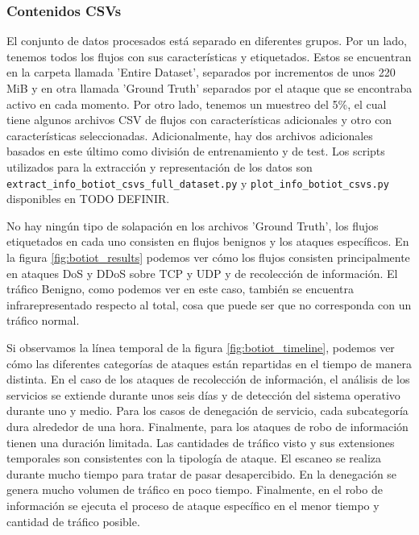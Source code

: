 \subsubsection{Contenidos CSVs}

El conjunto de datos procesados está separado en diferentes grupos. Por un lado, tenemos todos los flujos con sus características y etiquetados. Estos se encuentran en la carpeta llamada 'Entire Dataset', separados por incrementos de unos 220 MiB y en otra llamada 'Ground Truth' separados por  el ataque que se encontraba activo en cada momento. Por otro lado, tenemos un muestreo del 5\%, el cual tiene algunos archivos CSV de flujos con características adicionales y otro con características seleccionadas. Adicionalmente, hay dos archivos adicionales basados en este último como división de entrenamiento y de test. Los scripts utilizados para la extracción y representación de los datos son \texttt{extract\_info\_botiot\_csvs\_full\_dataset.py} y \texttt{plot\_info\_botiot\_csvs.py} disponibles en TODO DEFINIR.

No hay ningún tipo de solapación en los archivos 'Ground Truth', los flujos etiquetados en cada uno consisten en flujos benignos y los ataques específicos. En la figura \ref{fig:botiot_results} podemos ver cómo los flujos consisten principalmente en ataques DoS y DDoS sobre TCP y UDP y de recolección de información. El tráfico Benigno, como podemos ver en este caso, también se encuentra infrarepresentado respecto al total, cosa que puede ser que no corresponda con un tráfico normal. 

Si observamos la línea temporal de la figura \ref{fig:botiot_timeline}, podemos ver cómo las diferentes categorías de ataques están repartidas en el tiempo de manera distinta. En el caso de los ataques de recolección de información, el análisis de los servicios se extiende durante unos seis días y de detección del sistema operativo durante uno y medio. Para los casos de denegación de servicio, cada subcategoría dura alrededor de una hora. Finalmente, para los ataques de robo de información tienen una duración limitada. Las cantidades de tráfico visto y sus extensiones temporales son consistentes con la tipología de ataque. El escaneo se realiza durante mucho tiempo para tratar de pasar desapercibido. En la denegación se genera mucho volumen de tráfico en poco tiempo. Finalmente, en el robo de información se ejecuta el proceso de ataque específico en el menor tiempo y cantidad de tráfico posible.

